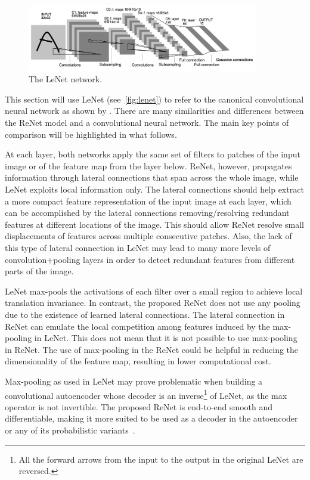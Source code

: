 \begin{figure}[t]
    \centering
    \includegraphics[width=0.9\textwidth]{img/renet/lenet5.jpg}
    \caption{The LeNet network.}
    \label{fig:lenet}
    \vspace{-3mm}
\end{figure}

This section will use LeNet (see~\autoref{fig:lenet}) to refer to the canonical
convolutional neural network as shown by \citet{LeCun89}. There are many
similarities and differences between the ReNet model and a convolutional neural
network. The main key points of comparison will be highlighted in what follows.

At each layer, both networks apply the same set of filters to patches of the
input image or of the feature map from the layer below. ReNet, however,
propagates information through lateral connections that span across the whole
image, while LeNet exploits local information only. The lateral connections
should help extract a more compact feature representation of the input image at
each layer, which can be accomplished by the lateral connections
removing/resolving redundant features at different locations of the image. This
should allow ReNet resolve small displacements of features across multiple
consecutive patches. Also, the lack of this type of lateral connection in LeNet
may lead to many more levels of convolution+pooling layers in order to detect
redundant features from different parts of the image.

LeNet max-pools the activations of each filter over a small region to achieve
local translation invariance. In contrast, the proposed ReNet does not use any
pooling due to the existence of learned lateral connections. The lateral
connection in ReNet can emulate the local competition among features induced by
the max-pooling in LeNet.  This does not mean that it is not possible to use
max-pooling in ReNet. The use of max-pooling in the ReNet could be helpful in
reducing the dimensionality of the feature map, resulting in lower computational
cost.

Max-pooling as used in LeNet may prove problematic when building a
convolutional autoencoder whose decoder is an inverse\footnote{%
    All the forward arrows from the input to the output in the original LeNet
    are reversed.
}
of LeNet, as the max operator is not invertible. The proposed
ReNet is end-to-end smooth and differentiable, making it more suited to be used
as a decoder in the autoencoder or any of its probabilistic
variants~\citep[see e.g.,][]{Kingma+Welling-ICLR2014}.

